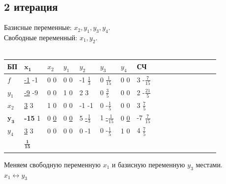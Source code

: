 \documentclass[14pt,a4paper,fleqn]{extarticle}
\begin{document}
	\subsection*{2 итерация}
	Базисные переменные: $x_2, y_1, y_3, y_4$.\\
	Свободные переменный: $x_1, y_2$.\\\\
	\begin{tabularx}{\textwidth}{V{1}p{1.45cm}V{5}p{1.45cm}V{5}p{1.45cm}V{1}p{1.45cm}V{1}p{1.45cm}V{1}p{1.45cm}V{1}p{1.4cm}V{1}p{1.4cm}V{1}}
		\hline
		БП & $\boldsymbol{x_1}$ & $x_2$ & $y_1$ & $y_2$ & $y_3$ & $y_4$ & СЧ\\
		\hline
		$f$ & \underline{-1} \footnotesize -1 & 0 \footnotesize 0 & 0 \footnotesize 0 & -1 \footnotesize $\frac{1}{3}$ & 0 \footnotesize $\frac{1}{15}$ & 0 \footnotesize 0 & 3 \footnotesize -$\frac{7}{15}$\\
		\hline
		$y_1$ & \underline{-9} \footnotesize -9 & 0 \footnotesize 0 & 1 \footnotesize 0 & 2 \footnotesize 3 & 0 \footnotesize $\frac{3}{5}$ & 0 \footnotesize 0 & 2 \footnotesize -$\frac{21}{5}$\\
		\hline
		$x_2$ & \underline{3} \footnotesize 3 & 1 \footnotesize 0 & 0 \footnotesize 0 & -1 \footnotesize -1 & 0 \footnotesize -$\frac{1}{5}$ & 0 \footnotesize 0 & 3 \footnotesize $\frac{7}{5}$\\
		\Xhline{5\arrayrulewidth}
		$\boldsymbol{y_3}$ & \textbf{-15} \footnotesize 1 & 0 \footnotesize \underline{0} & 0 \footnotesize \underline{0} & 5 \footnotesize \underline{-$\frac{1}{3}$} & 1 \footnotesize \underline{-$\frac{1}{15}$} & 0 \footnotesize \underline{0} & -7 \footnotesize \underline{$\frac{7}{15}$}\\
		\Xhline{5\arrayrulewidth}
		$y_4$ & \underline{3} \footnotesize 3 & 0 \footnotesize 0 & 0 \footnotesize 0 & 0 \footnotesize -1 & 0 \footnotesize -$\frac{1}{5}$ & 1 \footnotesize 0 & 4 \footnotesize $\frac{7}{5}$\\
		\hline
		& \small $\boldsymbol{\frac{1}{15}}$ & & & & & & \\
		\hdashline
	\end{tabularx}
	\newline\newline
	Меняем свободную переменную $x_1$ и базисную переменную $y_3$ местами.\\
	$x_1 \leftrightarrow y_3$
\end{document}
